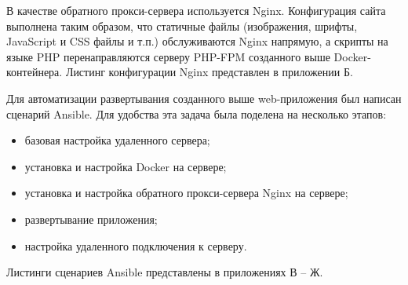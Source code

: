 В качестве обратного прокси-сервера используется Nginx. Конфигурация сайта
выполнена таким образом, что статичные файлы (изображения, шрифты, JavaScript и
CSS файлы и т.п.) обслуживаются Nginx напрямую, а скрипты на языке PHP
перенаправляются серверу PHP-FPM созданного выше Docker-контейнера. Листинг
конфигурации Nginx представлен в приложении Б.

Для автоматизации развертывания созданного выше web-приложения был написан
сценарий Ansible. Для удобства эта задача была поделена на несколько этапов:
\begin{itemize}
    \item базовая настройка удаленного сервера;
    \item установка и настройка Docker на сервере;
    \item установка и настройка обратного прокси-сервера Nginx на сервере;
    \item развертывание приложения;
    \item настройка удаленного подключения к серверу.
\end{itemize}

Листинги сценариев Ansible представлены в приложениях В -- Ж.
